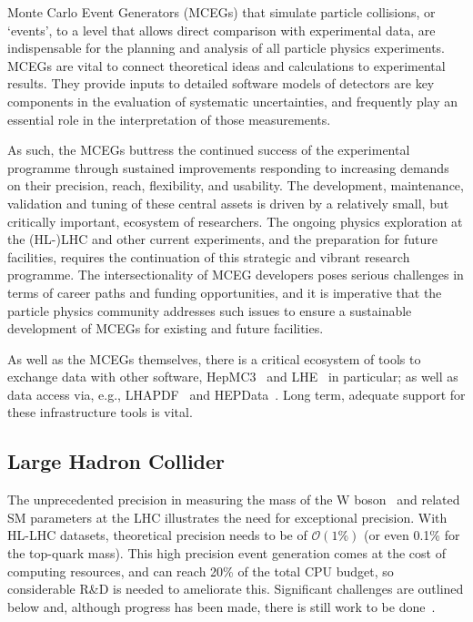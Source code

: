 \documentclass[10pt,a4paper]{article}
\begin{document}
Monte Carlo Event Generators (MCEGs) that simulate particle collisions,
or `events', to a level that allows direct comparison with
experimental data, are indispensable for the planning and analysis of
all particle physics experiments. MCEGs are vital to connect
theoretical ideas and calculations
to experimental results. They provide inputs to
detailed software models of detectors are key components in the
evaluation of systematic uncertainties, and frequently
play an essential role in the interpretation of those measurements.

As such, the MCEGs buttress the continued success of the experimental programme
through sustained improvements responding to increasing demands on their
precision, reach, flexibility, and usability. The development, maintenance,
validation and tuning of these central assets is driven by a relatively small,
but critically important, ecosystem of researchers. The ongoing physics
exploration at the (HL-)LHC and other current experiments, and the preparation
for future facilities, requires the continuation of this strategic and vibrant
research programme. The intersectionality of MCEG developers poses serious
challenges in terms of career paths and funding opportunities, and it is
imperative that the particle physics community addresses such issues to ensure a
sustainable development of MCEGs for existing and future facilities.

As well as the MCEGs themselves, there is a critical ecosystem of tools to
exchange data with other software, HepMC3~\cite{BUCKLEY2021107310} and
LHE~\cite{ALWALL2007300} in particular; as well as data access via, e.g.,
LHAPDF~\cite{Buckley2015LHAPDF} and HEPData~\cite{Maguire_2017}. Long term,
adequate support for these infrastructure tools is vital.

\subsection{Large Hadron Collider}\label{large-hadron-collider}

The unprecedented precision in measuring the mass of the $\mathrm{W}$
boson~\cite{CMS:2024lrd} and related SM parameters at the LHC illustrates the
need for exceptional precision. With HL-LHC datasets, theoretical precision
needs to be of $\mathcal{O}(1\%)$ (or even 0.1\% for the top-quark mass). This
high precision event generation comes at the cost of computing resources, and
can reach 20\% of the total CPU budget, so considerable R\&D is needed to
ameliorate this. Significant challenges are outlined below and, although
progress has been made, there is still work to be
done~\cite{HSFPhysicsEventGeneratorWG:2020gxw,maltoni2022tf07snowmassreporttheory,10.21468/SciPostPhys.16.5.130}.
\end{document}
